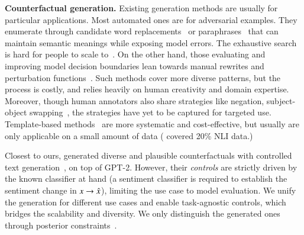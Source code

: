 \noindent\textbf{Counterfactual generation.}
Existing generation methods are usually for particular applications.
Most automated ones are for adversarial examples. 
They enumerate through candidate word replacements~\cite{alzantot2018generating, garg2020bae, alzantot2018generating, andreas2019good} or paraphrases~\cite{iyyer2018adversarial, malandrakis-etal-2019-controlled} that can maintain semantic meanings while exposing model errors.
The exhaustive search is hard for people to scale to~\cite{ribeiro2018sear}.
On the other hand, those evaluating and improving model decision boundaries lean towards manual rewrites and perturbation functions~\cite{checklist:acl20}.
Such methods cover more diverse patterns, but the process is costly, and relies heavily on human creativity and domain expertise.
Moreover, though human annotators also share strategies like negation, subject-object swapping~\cite{kaushik2019learning, gardner2020contrast}, the strategies have yet to be captured for targeted use.
Template-based methods~\cite{mccoy2019right, nie2019analyzing} are more systematic and cost-effective, but usually are only applicable on a small amount of data (\eg \citet{li2020linguistically} covered 20\% NLI data.)

Closest to ours, \citet{madaan2020generate} generated diverse and plausible counterfactuals with controlled text generation~\cite{Dathathri2020Plug}, on top of GPT-2.
However, their \emph{controls} are strictly driven by the known classifier at hand (\eg a sentiment classifier is required to establish the sentiment change in $x\rightarrow \hat{x}$), limiting the use case to model evaluation.
We unify the generation for different use cases and enable task-agnostic controls, which bridges the scalability and diversity.
We only distinguish the generated ones through posterior constraints~\cite{morris2020textattack, alzantot-etal-2018-generating}.







